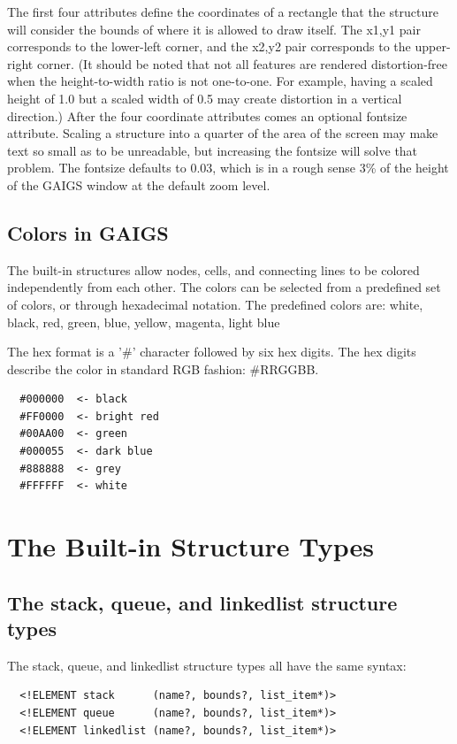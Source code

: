 \documentclass[11pt,letterpaper]{book}
\begin{document}
  The first four attributes define the coordinates of a rectangle that
  the structure will consider the bounds of where it is allowed to
  draw itself. The x1,y1 pair corresponds to the lower-left corner,
  and the x2,y2 pair corresponds to the upper-right corner. (It should
  be noted that not all features are rendered distortion-free when the
  height-to-width ratio is not one-to-one. For example, having a
  scaled height of 1.0 but a scaled width of 0.5 may create distortion
  in a vertical direction.) After the four coordinate attributes comes
  an optional fontsize attribute. Scaling a structure into a quarter
  of the area of the screen may make text so small as to be unreadable, but
  increasing the fontsize will solve that problem. The fontsize
  defaults to 0.03, which is in a rough sense 3\% of the height of the
  GAIGS window at the default zoom level.



\subsection{Colors in GAIGS}


The built-in structures allow nodes, cells, and connecting lines to be
colored independently from each other. The colors can be selected from
a predefined set of colors, or through hexadecimal notation.  The
predefined colors are: white, black, red, green, blue, yellow,
magenta, light blue

The hex format is a '\#' character followed by six hex digits. The hex
digits describe the color in standard RGB fashion: \#RRGGBB.


\footnotesize \begin{verbatim}
  #000000  <- black
  #FF0000  <- bright red
  #00AA00  <- green
  #000055  <- dark blue
  #888888  <- grey
  #FFFFFF  <- white
\end{verbatim} \normalsize


\section{The Built-in Structure Types}
\subsection{The stack, queue, and linkedlist structure types}


The stack, queue, and linkedlist structure types all have the same syntax:

\footnotesize \begin{verbatim}
  <!ELEMENT stack      (name?, bounds?, list_item*)>
  <!ELEMENT queue      (name?, bounds?, list_item*)>
  <!ELEMENT linkedlist (name?, bounds?, list_item*)>
\end{verbatim} \normalsize
  
\end{document}
